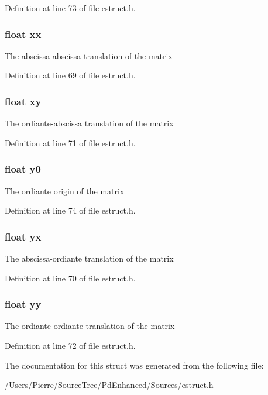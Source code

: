 Definition at line 73 of file estruct.\-h.

\hypertarget{struct__matrix_a9fb9d00fbbf390e0263bcc204b03c7c8}{
\subsubsection[{xx}]{\setlength{\rightskip}{0pt plus 5cm}float xx}}\label{struct__matrix_a9fb9d00fbbf390e0263bcc204b03c7c8}
The abscissa-\/abscissa translation of the matrix 

Definition at line 69 of file estruct.\-h.

\hypertarget{struct__matrix_a83a7590defc35766f789fbbf7fc41590}{
\subsubsection[{xy}]{\setlength{\rightskip}{0pt plus 5cm}float xy}}\label{struct__matrix_a83a7590defc35766f789fbbf7fc41590}
The ordiante-\/abscissa translation of the matrix 

Definition at line 71 of file estruct.\-h.

\hypertarget{struct__matrix_adf19b8ba42d497d3093c3a51b1a32cca}{
\subsubsection[{y0}]{\setlength{\rightskip}{0pt plus 5cm}float y0}}\label{struct__matrix_adf19b8ba42d497d3093c3a51b1a32cca}
The ordiante origin of the matrix 

Definition at line 74 of file estruct.\-h.

\hypertarget{struct__matrix_a8e1608facba0c31efe99d65811fab570}{
\subsubsection[{yx}]{\setlength{\rightskip}{0pt plus 5cm}float yx}}\label{struct__matrix_a8e1608facba0c31efe99d65811fab570}
The abscissa-\/ordiante translation of the matrix 

Definition at line 70 of file estruct.\-h.

\hypertarget{struct__matrix_a342cbf7f29a65a0d1a2949ef4675008e}{
\subsubsection[{yy}]{\setlength{\rightskip}{0pt plus 5cm}float yy}}\label{struct__matrix_a342cbf7f29a65a0d1a2949ef4675008e}
The ordiante-\/ordiante translation of the matrix 

Definition at line 72 of file estruct.\-h.



The documentation for this struct was generated from the following file\-:\begin{DoxyCompactItemize}
\item 
/\-Users/\-Pierre/\-Source\-Tree/\-Pd\-Enhanced/\-Sources/\hyperlink{estruct_8h}{estruct.\-h}\end{DoxyCompactItemize}
